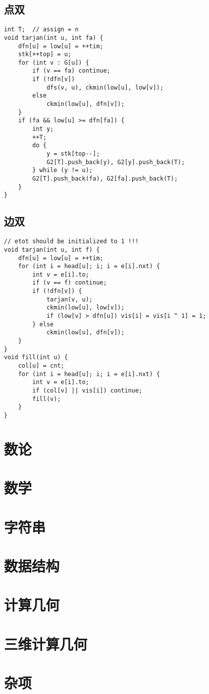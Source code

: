 \documentclass[twoside]{article}
\begin{document}
\subsection{点双}
\begin{lstlisting}
int T;  // assign = n
void tarjan(int u, int fa) {
    dfn[u] = low[u] = ++tim;
    stk[++top] = u;
    for (int v : G[u]) {
        if (v == fa) continue;
        if (!dfn[v])
            dfs(v, u), ckmin(low[u], low[v]);
        else
            ckmin(low[u], dfn[v]);
    }
    if (fa && low[u] >= dfn[fa]) {
        int y;
        ++T;
        do {
            y = stk[top--];
            G2[T].push_back(y), G2[y].push_back(T);
        } while (y != u);
        G2[T].push_back(fa), G2[fa].push_back(T);
    }
}\end{lstlisting}
\subsection{边双}
\begin{lstlisting}
// etot should be initialized to 1 !!!
void tarjan(int u, int f) {
    dfn[u] = low[u] = ++tim;
    for (int i = head[u]; i; i = e[i].nxt) {
        int v = e[i].to;
        if (v == f) continue;
        if (!dfn[v]) {
            tarjan(v, u);
            ckmin(low[u], low[v]);
            if (low[v] > dfn[u]) vis[i] = vis[i ^ 1] = 1;
        } else
            ckmin(low[u], dfn[v]);
    }
}
void fill(int u) {
    col[u] = cnt;
    for (int i = head[u]; i; i = e[i].nxt) {
        int v = e[i].to;
        if (col[v] || vis[i]) continue;
        fill(v);
    }
}\end{lstlisting}
\clearpage\section{数论}
\clearpage\section{数学}
\clearpage\section{字符串}
\clearpage\section{数据结构}
\clearpage\section{计算几何}
\clearpage\section{三维计算几何}
\clearpage\section{杂项}
\end{document}
